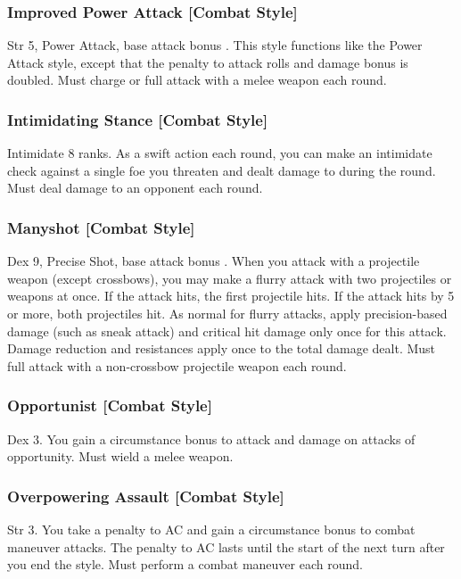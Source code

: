 \subsubsection{Improved Power Attack [Combat Style]}
 Str 5, Power Attack, base attack bonus .
 This style functions like the Power Attack style, except that the penalty to attack rolls and damage bonus is doubled.
 Must charge or full attack with a melee weapon each round.

\subsubsection{Intimidating Stance [Combat Style]}
 Intimidate 8 ranks.
 As a swift action each round, you can make an intimidate check against a single foe you threaten and dealt damage to during the round.
 Must deal damage to an opponent each round.

\subsubsection{Manyshot [Combat Style]}
 Dex 9, Precise Shot, base attack bonus .
 When you attack with a projectile weapon (except crossbows), you may make a flurry attack with two projectiles or weapons at once. If the attack hits, the first projectile hits. If the attack hits by 5 or more, both projectiles hit. As normal for flurry attacks, apply precision-based damage (such as sneak attack) and critical hit damage only once for this attack. Damage reduction and resistances apply once to the total damage dealt.
 Must full attack with a non-crossbow projectile weapon each round.

\subsubsection{Opportunist [Combat Style]}
 Dex 3.
 You gain a  circumstance bonus to attack and damage on attacks of opportunity. \babscalingdescription
{} Must wield a melee weapon.

\subsubsection{Overpowering Assault [Combat Style]}
 Str 3.
 You take a  penalty to AC and gain a  circumstance bonus to combat maneuver attacks. \babscalingdescription The penalty to AC lasts until the start of the next turn after you end the style.
 Must perform a combat maneuver each round.

